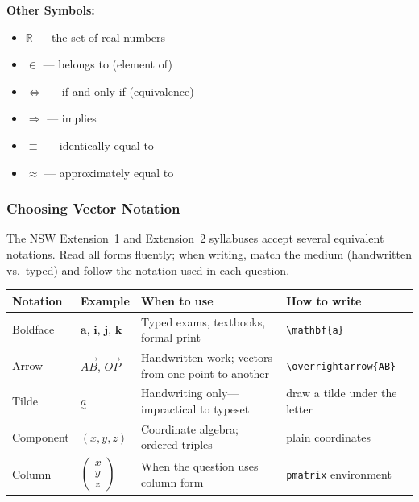 \documentclass[12pt]{article}
\begin{document}
\vspace{0.3em}
\noindent\textbf{Other Symbols:}
\begin{itemize}[leftmargin=*]
  \item $\mathbb{R}$ --- the set of real numbers
  \item $\in$ --- belongs to (element of)
  \item $\Leftrightarrow$ --- if and only if (equivalence)
  \item $\Rightarrow$ --- implies
  \item $\equiv$ --- identically equal to
  \item $\approx$ --- approximately equal to
\end{itemize}

\subsubsection{Choosing Vector Notation}

The NSW Extension~1 and Extension~2 syllabuses accept several equivalent notations. Read all forms fluently; when writing, match the medium (handwritten vs.\ typed) and follow the notation used in each question.

\vspace{0.3em}
\begingroup
\small
\setlength{\tabcolsep}{5pt}
\renewcommand{\arraystretch}{1.3}
\begin{center}
\begin{tabular}{|p{}|p{}|p{}|p{}|}
\hline
\textbf{Notation} &
\textbf{Example} &
\textbf{When to use} &
\textbf{How to write} \\
\hline
Boldface &
$\mathbf{a}$, $\mathbf{i}$, $\mathbf{j}$, $\mathbf{k}$ &
Typed exams, textbooks, formal print &
\texttt{\textbackslash mathbf\{a\}} \\
\hline
Arrow &
$\overrightarrow{AB}$, $\overrightarrow{OP}$ &
Handwritten work; vectors from one point to another &
\texttt{\textbackslash overrightarrow\{AB\}} \\
\hline
Tilde &
$\underset{\sim}{a}$ &
Handwriting only---impractical to typeset &
draw a tilde under the letter \\
\hline
Component &
$(x, y, z)$ &
Coordinate algebra; ordered triples &
plain coordinates \\
\hline
Column &
$\begin{pmatrix} x \\ y \\ z \end{pmatrix}$ &
When the question uses column form &
\texttt{pmatrix} environment \\
\hline
\end{tabular}
\end{center}
\endgroup
\end{document}
